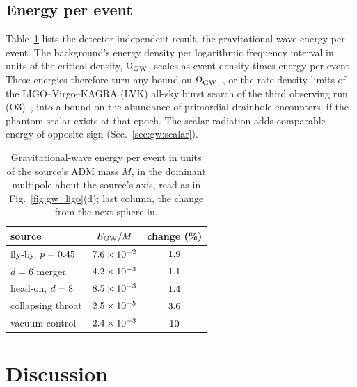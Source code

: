 \documentclass[twocolumn,floatfix,aps,prd,superscriptaddress,nofootinbib]{revtex4-2}
\begin{document}
\subsection{Energy per event}
\label{sec:ligo:burst}

Table~\ref{tab:energies} lists the detector-independent result, the gravitational-wave energy per event. The background's energy density per logarithmic frequency interval in units of the critical density, $\Omega_{\rm GW}$, scales as event density times energy per event. These energies therefore turn any bound on $\Omega_{\rm GW}$~\cite{lvk2021,pagano2016}, or the rate-density limits of the LIGO--Virgo--KAGRA (LVK) all-sky burst search of the third observing run (O3)~\cite{lvk2021burst}, into a bound on the abundance of primordial drainhole encounters, if the phantom scalar exists at that epoch. The scalar radiation adds comparable energy of opposite sign (Sec.~\ref{sec:gw:scalar}).

\begin{table}[t]
\caption{Gravitational-wave energy per event in units of the source's ADM mass $M$, in the dominant multipole about the source's axis, read as in Fig.~\ref{fig:gw_ligo}(d); last column, the change from the next sphere in.}
\label{tab:energies}
\begin{ruledtabular}
\begin{tabular}{lcc}
source & $E_{\rm GW}/M$ & change (\%) \\
\hline
fly-by, $p=0.45$ & $7.6\times10^{-2}$ & $1.9$ \\
$d=6$ merger & $4.2\times10^{-3}$ & $1.1$ \\
head-on, $d=8$ & $8.5\times10^{-3}$ & $1.4$ \\
collapsing throat & $2.5\times10^{-5}$ & $3.6$ \\
vacuum control & $2.4\times10^{-3}$ & $10$ \\
\end{tabular}
\end{ruledtabular}
\end{table}

\section{Discussion}
\label{sec:discussion}
\end{document}

